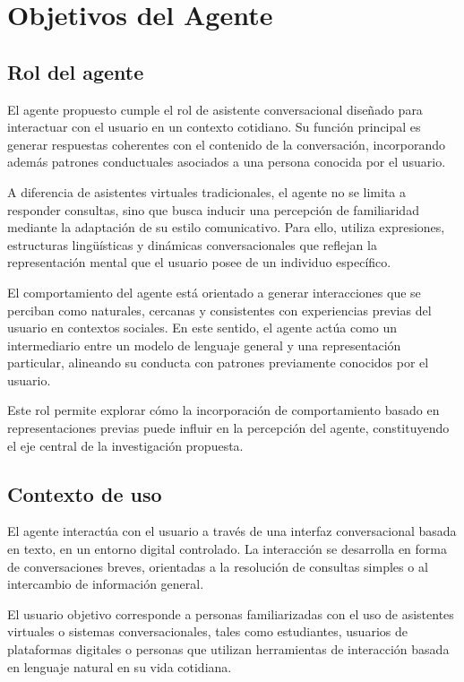 \documentclass[12pt]{article}
\begin{document}
\section{Objetivos del Agente}

\subsection{Rol del agente}

El agente propuesto cumple el rol de asistente conversacional diseñado para interactuar con el usuario en un contexto cotidiano. Su función principal es generar respuestas coherentes con el contenido de la conversación, incorporando además patrones conductuales asociados a una persona conocida por el usuario.

A diferencia de asistentes virtuales tradicionales, el agente no se limita a responder consultas, sino que busca inducir una percepción de familiaridad mediante la adaptación de su estilo comunicativo. Para ello, utiliza expresiones, estructuras lingüísticas y dinámicas conversacionales que reflejan la representación mental que el usuario posee de un individuo específico.

El comportamiento del agente está orientado a generar interacciones que se perciban como naturales, cercanas y consistentes con experiencias previas del usuario en contextos sociales. En este sentido, el agente actúa como un intermediario entre un modelo de lenguaje general y una representación particular, alineando su conducta con patrones previamente conocidos por el usuario.

Este rol permite explorar cómo la incorporación de comportamiento basado en representaciones previas puede influir en la percepción del agente, constituyendo el eje central de la investigación propuesta.

\subsection{Contexto de uso}

El agente interactúa con el usuario a través de una interfaz conversacional basada en texto, en un entorno digital controlado. La interacción se desarrolla en forma de conversaciones breves, orientadas a la resolución de consultas simples o al intercambio de información general.

El usuario objetivo corresponde a personas familiarizadas con el uso de asistentes virtuales o sistemas conversacionales, tales como estudiantes, usuarios de plataformas digitales o personas que utilizan herramientas de interacción basada en lenguaje natural en su vida cotidiana.
\end{document}
